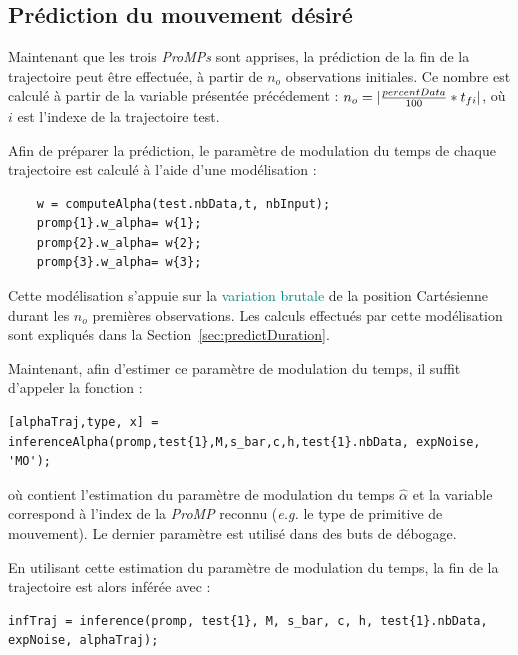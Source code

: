 \documentclass[utf8]{frontiersSCNS} %
\newcommand{\rev}[1]{\textcolor{blue}{#1}}
\newcommand{\toimprove}[1]{\textcolor{teal}{#1}}
\begin{document}
\subsection{Prédiction du mouvement désiré}

Maintenant que les trois \textit{ProMPs} sont apprises, la prédiction de la fin de la trajectoire peut être effectuée, à partir de $n_o$ observations initiales.
Ce nombre est calculé à partir de la variable présentée précédement  : $n_o= |{percentData \over 100}* t_{fi}|$, où $i$ est l'indexe de la trajectoire test.

Afin de préparer la prédiction, le paramètre de modulation du temps de chaque trajectoire est calculé à l'aide d'une modélisation :
\begin{lstlisting}
    w = computeAlpha(test.nbData,t, nbInput);
    promp{1}.w_alpha= w{1};
    promp{2}.w_alpha= w{2};
    promp{3}.w_alpha= w{3};
\end{lstlisting}
Cette modélisation s'appuie sur la \toimprove{variation brutale} de la position Cartésienne durant les $n_o$ premières observations. Les calculs effectués par cette modélisation sont expliqués dans la Section~\ref{sec:predictDuration}.

Maintenant, afin d'estimer ce paramètre de modulation du temps, il suffit d'appeler la fonction :
\begin{lstlisting}
[alphaTraj,type, x] = inferenceAlpha(promp,test{1},M,s_bar,c,h,test{1}.nbData, expNoise, 'MO');
\end{lstlisting}
où  contient l'estimation du paramètre de modulation du temps $\hat{\alpha}$ et la variable  correspond à l'index de la \textit{ProMP} reconnu (\textit{e.g.} le type de primitive de mouvement). Le dernier paramètre  est utilisé dans des buts de débogage.

En utilisant cette estimation du paramètre de modulation du temps, la fin de la trajectoire est alors inférée avec :
\begin{lstlisting}
infTraj = inference(promp, test{1}, M, s_bar, c, h, test{1}.nbData, expNoise, alphaTraj);
\end{lstlisting}
%
\end{document}
